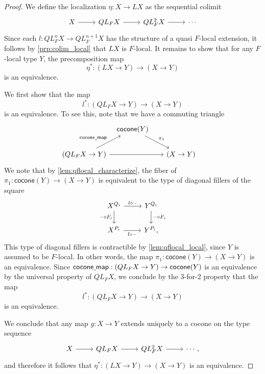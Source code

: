 \begin{proof}
We define the localization $\eta:X\to LX$ as the sequential colimit
\begin{equation*}
\begin{tikzcd}
X \arrow[r] & QL_F X \arrow[r] & QL_F^2 X \arrow[r] & \cdots
\end{tikzcd}
\end{equation*}
Since each $l:QL_F^n X\to QL_F^{n+1}X$ has the structure of a quasi $F$-local extension, it follows by \cref{prp:colim_local} that $LX$ is $F$-local. It remains to show that for any $F$-local type $Y$, the precomposition map
\begin{equation*}
\eta^\ast : (LX\to Y)\to (X\to Y)
\end{equation*}
is an equivalence.

We first show that the map
\begin{equation*}
l^\ast : (QL_F X\to Y)\to (X\to Y)
\end{equation*}
is an equivalence. To see this, note that we have a commuting triangle
\begin{equation*}
\begin{tikzcd}[column sep=tiny]
& \mathsf{cocone}(Y) \arrow[dr,"\pi_1"] & \phantom{(QL_F X\to Y)} \\
(QL_F X\to Y) \arrow[rr] \arrow[ur,"\mathsf{cocone\usc{}map}"] & & (X\to Y)
\end{tikzcd}
\end{equation*}
We note that by \cref{lem:qflocal_characterize}, the fiber of $\pi_1:\mathsf{cocone}(Y)\to (X\to Y)$ is equivalent to the type of diagonal fillers of the square
\begin{equation*}
\begin{tikzcd}
X^{Q_i} \arrow[r,"l\circ\blank"] \arrow[d,swap,"\blank\circ F_i"] & Y^{Q_i} \arrow[d,"\blank\circ F_i"] \\
X^{P_i} \arrow[r,swap,"l\circ \blank"] & Y^{P_i},
\end{tikzcd}
\end{equation*}
This type of diagonal fillers is contractible by \cref{lem:qflocal_local}, since $Y$ is assumed to be $F$-local. In other words, the map $\pi_1:\mathsf{cocone}(Y)\to (X\to Y)$ is an equivalence. Since $\mathsf{cocone\underline{\ }{}map}:(QL_F X\to Y)\to \mathsf{cocone}(Y)$ is an equivalence by the universal property of $QL_F X$, we conclude by the 3-for-2 property that the map
\begin{equation*}
l^\ast : (QL_F X\to Y)\to (X\to Y)
\end{equation*}
is an equivalence.

We conclude that any map $g:X\to Y$ extends uniquely to a cocone on the type sequence
\begin{equation*}
\begin{tikzcd}
X \arrow[r] & QL_F X \arrow[r] & QL_F^2 X \arrow[r] & \cdots,
\end{tikzcd}
\end{equation*}
and therefore it follows that $\eta^\ast:(LX\to Y)\to (X\to Y)$ is an equivalence.
\end{proof}

